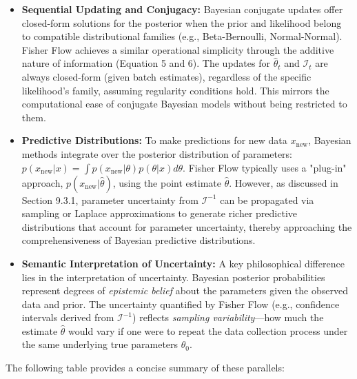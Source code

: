 \documentclass[11pt]{article}
\begin{document}
\begin{itemize}
    \item \textbf{Sequential Updating and Conjugacy:}
    Bayesian conjugate updates offer closed-form solutions for the posterior when the prior and likelihood belong to compatible distributional families (e.g., Beta-Bernoulli, Normal-Normal). Fisher Flow achieves a similar operational simplicity through the additive nature of information (Equation 5 and 6). The updates for $\hat{\theta}_t$ and $\mathcal{I}_t$ are always closed-form (given batch estimates), regardless of the specific likelihood's family, assuming regularity conditions hold. This mirrors the computational ease of conjugate Bayesian models without being restricted to them.

    \item \textbf{Predictive Distributions:}
    To make predictions for new data $x_{\text{new}}$, Bayesian methods integrate over the posterior distribution of parameters: $p(x_{\text{new}}|x) = \int p(x_{\text{new}}|\theta)p(\theta|x)d\theta$. Fisher Flow typically uses a "plug-in" approach, $p(x_{\text{new}}|\hat{\theta})$, using the point estimate $\hat{\theta}$. However, as discussed in Section 9.3.1, parameter uncertainty from $\mathcal{I}^{-1}$ can be propagated via sampling or Laplace approximations \cite{tierney1986accurate} to generate richer predictive distributions that account for parameter uncertainty, thereby approaching the comprehensiveness of Bayesian predictive distributions.

    \item \textbf{Semantic Interpretation of Uncertainty:}
    A key philosophical difference lies in the interpretation of uncertainty. Bayesian posterior probabilities represent degrees of \textit{epistemic belief} about the parameters given the observed data and prior. The uncertainty quantified by Fisher Flow (e.g., confidence intervals derived from $\mathcal{I}^{-1}$) reflects \textit{sampling variability}---how much the estimate $\hat{\theta}$ would vary if one were to repeat the data collection process under the same underlying true parameters $\theta_0$.
\end{itemize}

The following table provides a concise summary of these parallels:
\end{document}
